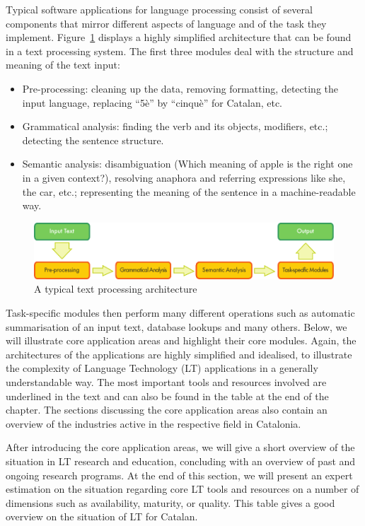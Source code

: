 \documentclass[]{../../metanetpaper}
\begin{document}
\begin{multicols}{2}
Typical software applications for language processing consist of several components that mirror different aspects of language and of the task they implement. Figure~\ref{fig:textprocessingarch_en} displays a highly simplified architecture that can be found in a text processing system. The first three modules deal with the structure and meaning of the text input:
\begin{itemize}
\item Pre-processing: cleaning up the data, removing formatting, detecting the input language, replacing “5è” by “cinquè” for Catalan, etc.
\item Grammatical analysis: finding the verb and its objects, modifiers, etc.; detecting the sentence structure.
\item Semantic analysis: disambiguation (Which meaning of apple is the right one in a given context?), resolving anaphora and referring expressions like she, the car, etc.; representing the meaning of the sentence in a machine-readable way.
\end{itemize}

\begin{figure}[b]
  \center
  \includegraphics[width=\textwidth]{../_media/english/text_processing_app_architecture}
  \caption{A typical text processing architecture}
  \label{fig:textprocessingarch_en}
\end{figure}

Task-specific modules then perform many different operations such as automatic summarisation of an input text, database lookups and many others. Below, we will illustrate core application areas and highlight their core modules. Again, the architectures of the applications are highly simplified and idealised, to illustrate the complexity of Language Technology (LT) applications in a generally understandable way. The most important tools and resources involved are underlined in the text and can also be found in the table at the end of the chapter.  The sections discussing the core application areas also contain an overview of the industries active in the respective field in Catalonia. 

After introducing the core application areas, we will give a short overview of the situation in LT research and education, concluding with an overview of past and ongoing research programs. At the end of this section, we will present an expert estimation on the situation regarding core LT tools and resources on a number of dimensions such as availability, maturity, or quality. This table gives a good overview on the situation of LT for Catalan.


\end{multicols}
\end{document}
